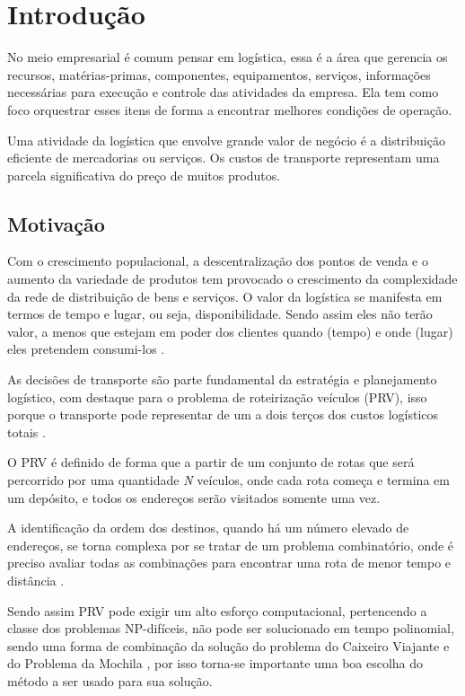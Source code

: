 \chapter[Introdução]{Introdução}

No meio empresarial é comum pensar em logística, essa é a área que gerencia os recursos, matérias-primas, componentes, equipamentos, serviços, informações necessárias para execução e controle das atividades da empresa. Ela tem como foco orquestrar esses itens de forma a encontrar melhores condições de operação.

Uma atividade da logística que envolve grande valor de negócio é a distribuição eficiente de mercadorias ou serviços. Os custos de transporte representam uma parcela significativa do preço de muitos produtos. \cite{DIAS}


\section{Motivação}

Com o crescimento populacional, a descentralização dos pontos de venda e o aumento da variedade de produtos tem provocado o crescimento da complexidade da rede de distribuição de bens e serviços. O valor da logística se manifesta em termos de tempo e lugar, ou seja, disponibilidade. Sendo assim eles não terão valor, a menos que estejam em poder dos clientes quando (tempo) e onde (lugar) eles
pretendem consumi-los \cite{TSUDA}.

As decisões de transporte são parte fundamental da estratégia e planejamento logístico, com destaque para o problema de roteirização veículos (PRV), isso porque o transporte  pode representar de um a dois terços dos custos logísticos totais \cite{Ballou, RODRIGUES}.

O PRV é definido de forma que a partir de um conjunto de rotas que será percorrido por uma quantidade \textit{N} veículos, onde cada rota começa e termina em um depósito, e todos os endereços serão visitados somente uma vez. 

A identificação da ordem dos destinos, quando há um número elevado de endereços, se torna complexa por se tratar de um problema combinatório, onde é preciso avaliar todas as combinações para encontrar uma rota de menor tempo e distância \cite{RMKarp}.

Sendo assim PRV pode exigir um alto esforço computacional, pertencendo a classe dos problemas NP-difíceis, não pode ser solucionado em tempo polinomial, sendo uma forma de combinação da solução do problema do Caixeiro Viajante e do Problema da Mochila \cite{HUMBERTO}, por isso torna-se importante uma boa escolha do método a ser usado para sua solução.

